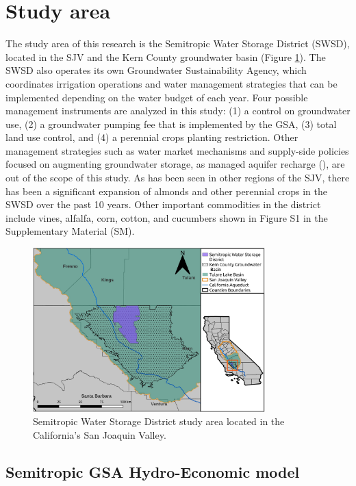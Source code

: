 \documentclass[a4paper,fleqn]{cas-sc}
\begin{document}
\section{Study area}

The study area of this research is the Semitropic Water Storage District (SWSD), located in the SJV and the Kern County groundwater basin (Figure \ref{fig:2}). The SWSD also operates its own Groundwater Sustainability Agency, which  coordinates irrigation operations and water management strategies that can be implemented depending on the water budget of each year. Four possible management instruments are analyzed in this study: (1) a control on groundwater use, (2) a groundwater pumping fee that is implemented by the GSA, (3) total land use control, and (4) a perennial crops planting restriction. Other management strategies such as water market mechanisms and supply-side policies focused on augmenting groundwater storage, as managed aquifer recharge (\citep{ulibarri_assessing_2021}), are out of the scope of this study. As has been seen in other regions of the SJV, there has been a significant expansion of almonds and other perennial crops in the SWSD over the past 10 years. Other important commodities in the district include vines, alfalfa, corn, cotton, and cucumbers shown in Figure S1 in the Supplementary Material (SM). 
  

\begin{figure}[ht]
    \centering
    \includegraphics[width=0.8\textwidth,center]{Map_Semitropic.jpg}
    \caption{Semitropic Water Storage District study area located in the California’s San Joaquin Valley.}
    \label{fig:2}
\end{figure}

\subsection{Semitropic GSA Hydro-Economic model}
\end{document}

